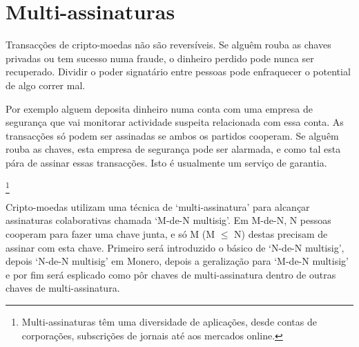 \chapter{Multi-assinaturas}
\label{chapter:multisignatures}

Transacções de cripto-moedas não são reversíveis. Se alguêm rouba as chaves privadas ou tem sucesso numa fraude, o dinheiro perdido pode nunca ser recuperado. Dividir o poder signatário entre pessoas pode enfraquecer o potential de algo correr mal. 


Por exemplo alguem deposita dinheiro numa conta com uma empresa de segurança que vai monitorar actividade suspeita relacionada com essa conta. As transacções só podem ser assinadas se ambos os partidos cooperam. Se alguêm rouba as chaves, esta empresa de segurança pode ser alarmada, e como tal esta pára de assinar essas transacções. Isto é usualmente um serviço de garantia.


\footnote{Multi-assinaturas têm uma diversidade de aplicações, desde contas de corporações, subscrições de jornais até aos mercados online.}

Cripto-moedas utilizam uma técnica de `multi-assinatura' para alcançar assinaturas colaborativas chamada `M-de-N multisig'. Em M-de-N, N pessoas cooperam para fazer uma chave junta, e só M (M $\leq$ N) destas precisam de assinar com esta chave. Primeiro será introduzido o básico de `N-de-N multisig', depois `N-de-N multisig' em Monero, depois a geralização para `M-de-N multisig' e por fim será esplicado como pôr chaves de multi-assinatura dentro de outras chaves de multi-assinatura.


